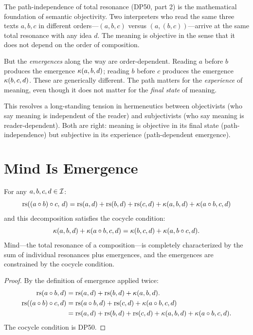 The path-independence of total resonance (DP50, part 2) is the mathematical
foundation of semantic objectivity.  Two interpreters who read the same three
texts $a, b, c$ in different orders---$(a, b, c)$ versus $(a, (b, c))$---arrive
at the same total resonance with any idea $d$.  The meaning is objective in
the sense that it does not depend on the order of composition.

But the \emph{emergences} along the way are order-dependent.  Reading $a$
before $b$ produces the emergence $\kappa(a, b, d)$; reading $b$ before $c$
produces the emergence $\kappa(b, c, d)$.  These are generically different.
The path matters for the \emph{experience} of meaning, even though it does
not matter for the \emph{final state} of meaning.

This resolves a long-standing tension in hermeneutics between objectivists
(who say meaning is independent of the reader) and subjectivists (who say
meaning is reader-dependent).  Both are right: meaning is objective in its
final state (path-independence) but subjective in its experience
(path-dependent emergence).

\section{Mind Is Emergence}

\begin{theorem}
\label{thm:mind-is-emergence}
For any $a, b, c, d \in \mathcal{I}$:
\[
\mathrm{rs}((a \circ b) \circ c,\, d)
= \mathrm{rs}(a, d) + \mathrm{rs}(b, d) + \mathrm{rs}(c, d)
  + \kappa(a, b, d) + \kappa(a \circ b, c, d)
\]
and this decomposition satisfies the cocycle condition:
\[
\kappa(a, b, d) + \kappa(a \circ b, c, d)
= \kappa(b, c, d) + \kappa(a, b \circ c, d).
\]
Mind---the total resonance of a composition---is completely characterized by
the sum of individual resonances plus emergences, and the emergences are
constrained by the cocycle condition.
\end{theorem}

\begin{proof}
By the definition of emergence applied twice:
\begin{align*}
\mathrm{rs}(a \circ b, d)
&= \mathrm{rs}(a, d) + \mathrm{rs}(b, d) + \kappa(a, b, d). \\
\mathrm{rs}((a \circ b) \circ c, d)
&= \mathrm{rs}(a \circ b, d) + \mathrm{rs}(c, d) + \kappa(a \circ b, c, d) \\
&= \mathrm{rs}(a, d) + \mathrm{rs}(b, d) + \mathrm{rs}(c, d)
   + \kappa(a, b, d) + \kappa(a \circ b, c, d).
\end{align*}
The cocycle condition is DP50.
\end{proof}

